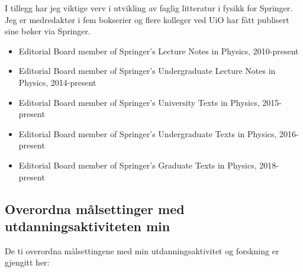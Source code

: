 \documentclass[aps,floatfix,preprint]{revtex4-1}
\begin{document}
I tillegg har jeg viktige verv i utvikling av faglig litteratur i fysikk for Springer. Jeg er medredaktør i fem bokserier og flere kolleger ved UiO har fått publisert sine bøker via Springer.

\begin{itemize}

\item Editorial Board member of Springer's Lecture Notes in Physics, 2010-present

\item Editorial Board member of Springer's Undergraduate Lecture Notes in Physics, 2014-present

\item Editorial Board member of Springer's University Texts  in Physics, 2015-present

\item Editorial Board member of Springer's Undergraduate Texts  in Physics, 2016-present

\item Editorial Board member of Springer's Graduate Texts  in Physics, 2018-present

\end{itemize}


\subsection*{Overordna målsettinger med utdanningsaktiviteten min}

De ti overordna målsettingene med min utdanningsaktivitet og forskning er gjengitt her:
\end{document}

